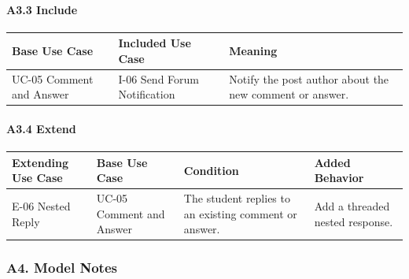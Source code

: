 \documentclass[12pt]{article}
\renewcommand{\baselinestretch}{1.5}
\begin{document}
\hypertarget{sec:a3-3-include}{}
\paragraph*{A3.3 Include}
\par\medskip

\begingroup
\small
\renewcommand{\baselinestretch}{1.0}\selectfont
\renewcommand{\arraystretch}{1.15}
\setlength{\tabcolsep}{6pt}
\begin{longtable}{|>{\raggedright\arraybackslash}p{}|>{\raggedright\arraybackslash}p{}|>{\raggedright\arraybackslash}p{}|}
\hline
\textbf{Base Use Case} & \textbf{Included Use Case} & \textbf{Meaning} \\ \hline
\endhead
UC-05 Comment and Answer & I-06 Send Forum Notification & Notify the post author about the new comment or answer. \\ \hline
\end{longtable}
\endgroup
\par\medskip

\hypertarget{sec:a3-4-extend}{}
\paragraph*{A3.4 Extend}
\par\medskip

\begingroup
\small
\renewcommand{\baselinestretch}{1.0}\selectfont
\renewcommand{\arraystretch}{1.15}
\setlength{\tabcolsep}{6pt}
\begin{longtable}{|>{\raggedright\arraybackslash}p{}|>{\raggedright\arraybackslash}p{}|>{\raggedright\arraybackslash}p{}|>{\raggedright\arraybackslash}p{}|}
\hline
\textbf{Extending Use Case} & \textbf{Base Use Case} & \textbf{Condition} & \textbf{Added Behavior} \\ \hline
\endhead
E-06 Nested Reply & UC-05 Comment and Answer & The student replies to an existing comment or answer. & Add a threaded nested response. \\ \hline
\end{longtable}
\endgroup
\par\medskip

\hypertarget{sec:a4-model-notes}{}
\subsubsection*{A4. Model Notes}
\par\medskip
\end{document}
